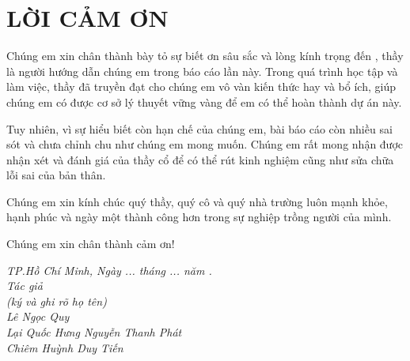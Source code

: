 \section*{LỜI CẢM ƠN}
	Chúng em xin chân thành bày tỏ sự biết ơn sâu sắc và lòng kính trọng đến \gvhd \mbox{}, thầy là người hướng dẫn chúng em trong báo cáo lần này. Trong quá trình học tập và làm việc, thầy đã truyền đạt cho chúng em vô vàn kiến thức hay và bổ ích, giúp chúng em có được cơ sở lý thuyết vững vàng để em có thể hoàn thành dự án này.

	Tuy nhiên, vì sự hiểu biết còn hạn chế của chúng em, bài báo cáo còn nhiều sai sót và chưa chỉnh chu như chúng em mong muốn. Chúng em rất mong nhận được nhận xét và đánh giá của thầy cổ để có thể rút kinh nghiệm cũng như sửa chữa lỗi sai của bản thân.

    Chúng em xin kính chúc quý thầy, quý cô và quý nhà trường luôn mạnh khỏe, hạnh phúc và ngày một thành công hơn trong sự nghiệp trồng người của mình. 
    
    Chúng em xin chân thành cảm ơn!\\
 \begin{center}
    \textit{
         \hspace*{7cm}TP.Hồ Chí Minh, Ngày ... tháng ... năm \nam.\\
	\hspace*{7cm}Tác giả\\
	\hspace*{7cm}(ký và ghi rõ họ tên)\\
	\vspace*{0.2cm}
	\vspace*{1cm}
	\hspace*{7cm}Lê Ngọc Quy\\
        \vspace*{0.2cm}
	\vspace*{1cm}
        \hspace*{7cm}Lại Quốc Hưng 
    \vspace*{0.2cm}
	\vspace*{1cm}
    \hspace*{7cm}Nguyễn Thanh Phát\\
        \vspace*{0.2cm}
	\vspace*{1cm}
        \hspace*{7cm}Chiêm Huỳnh Duy Tiến 
    }
	
\end{center}
\newpage